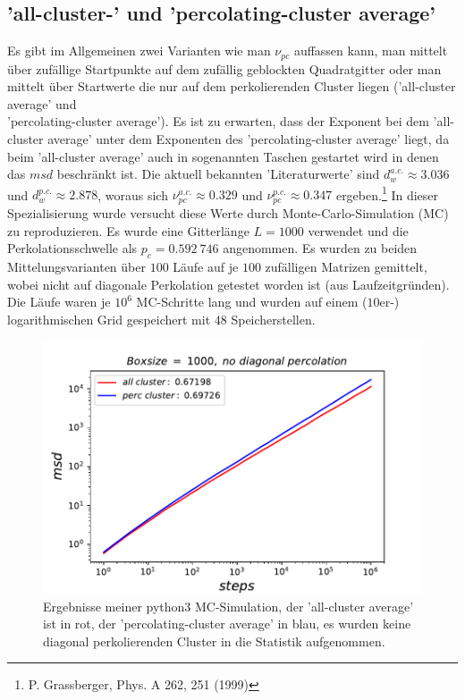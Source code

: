 \documentclass[a4paper, 12pt]{scrartcl}
\begin{document}
\newpage

\subsection{'all-cluster-' und 'percolating-cluster average'}

Es gibt im Allgemeinen zwei Varianten wie man $\nu_{pc}$ auffassen kann, man mittelt über zufällige Startpunkte auf dem zufällig geblockten Quadratgitter oder man mittelt über Startwerte die nur auf dem perkolierenden Cluster liegen ('all-cluster average' und \\ \noindent'percolating-cluster average'). Es ist zu erwarten, dass der Exponent bei dem 'all-cluster average' unter dem Exponenten des 'percolating-cluster average' liegt, da beim 'all-cluster average' auch in sogenannten Taschen gestartet wird in denen das $msd$ beschränkt ist. Die aktuell bekannten 'Literaturwerte' sind $d_w^{a.c.} \approx 3.036$ und $d_w^{p.c.} \approx 2.878$, woraus sich $\nu_{pc}^{a.c.} \approx 0.329$ und $\nu_{pc}^{p.c.} \approx 0.347$ ergeben.\footnote[4]{P. Grassberger, Phys. A 262, 251 (1999)} In dieser Spezialisierung wurde versucht diese Werte durch Monte-Carlo-Simulation (MC) zu reproduzieren. Es wurde eine Gitterlänge $L=1000$ verwendet und die Perkolationsschwelle als $p_c = 0.592\ 746$ angenommen. Es wurden zu beiden Mittelungsvarianten über $100$ Läufe auf je $100$ zufälligen Matrizen gemittelt, wobei nicht auf diagonale Perkolation getestet worden ist (aus Laufzeitgründen). Die Läufe waren je $10^6$ MC-Schritte lang und wurden auf einem ($10$er-) logarithmischen Grid gespeichert mit 48 Speicherstellen. 
\begin{figure}[h!]
\centering
\includegraphics[scale=0.9]{acpcold1000.pdf}
\caption{Ergebnisse meiner python3 MC-Simulation, der 'all-cluster average' ist in rot, der 'percolating-cluster average' in blau, es wurden keine diagonal perkolierenden Cluster in die Statistik aufgenommen.}
\end{figure}
\end{document}
